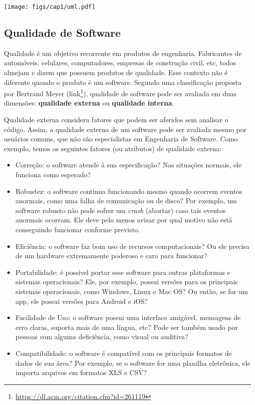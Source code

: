 \documentclass[
  11pt,
  twoside]{book}
\DeclareRobustCommand{\href}[2]{#2\footnote{\url{#1}}}
\let\origfigure\figure
\let\endorigfigure\endfigure
\renewenvironment{figure}[1][2] {
    \expandafter\origfigure\expandafter[!h]
} {
    \endorigfigure
}
\begin{document}
\begin{figure}
\centering
\texttt{[image: figs/cap1/uml.pdf]}
\caption{Exemplo de Diagrama de Classe UML}
\end{figure}

\hypertarget{qualidade-de-software}{%
\subsection{Qualidade de Software}\label{qualidade-de-software}}

 Qualidade é um objetivo recorrente em
produtos de engenharia. Fabricantes de automóveis, celulares,
computadores, empresas de construção civil, etc, todos almejam e dizem
que possuem produtos de qualidade. Esse contexto não é diferente quando
o produto é um software. Segundo uma classificação proposta por Bertrand
Meyer (\href{https://dl.acm.org/citation.cfm?id=261119}{link}),
qualidade de software pode ser avaliada em duas dimensões:
\textbf{qualidade externa} ou \textbf{qualidade interna}.

 Qualidade externa considera
fatores que podem ser aferidos sem analisar o código. Assim, a qualidade
externa de um software pode ser avaliada mesmo por usuários comuns, que
não são especialistas em Engenharia de Software. Como exemplo, temos os
seguintes fatores (ou atributos) de qualidade externa:

\begin{itemize}
\item
  Correção: o software atende à sua especificação? Nas situações
  normais, ele funciona como esperado?
\item
  Robustez: o software continua funcionando mesmo quando ocorrem eventos
  anormais, como uma falha de comunicação ou de disco? Por exemplo, um
  software robusto não pode sofrer um \emph{crash} (abortar) caso tais
  eventos anormais ocorram. Ele deve pelo menos avisar por qual motivo
  não está conseguindo funcionar conforme previsto.
\item
  Eficiência: o software faz bom uso de recursos computacionais? Ou ele
  precisa de um hardware extremamente poderoso e caro para funcionar?
\item
  Portabilidade: é possível portar esse software para outras plataformas
  e sistemas operacionais? Ele, por exemplo, possui versões para os
  principais sistemas operacionais, como Windows, Linux e Mac OS? Ou
  então, se for um app, ele possui versões para Android e iOS?
\item
  Facilidade de Uso: o software possui uma interface amigável, mensagens
  de erro claras, suporta mais de uma língua, etc? Pode ser também usado
  por pessoas com alguma deficiência, como visual ou auditiva?
\item
  Compatibilidade: o software é compatível com os principais formatos de
  dados de sua área? Por exemplo, se o software for uma planilha
  eletrônica, ele importa arquivos em formatos XLS e CSV?
\end{itemize}
\end{document}
